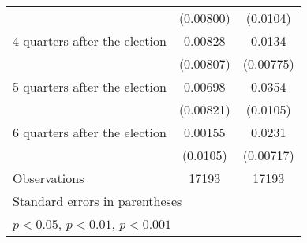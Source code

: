\begin{table}[htbp]
\begin{tabular}{l*{2}{c}}
                    &   (0.00800)         &    (0.0104)         \\
[1em]
 4 quarters after the election&     0.00828         &      0.0134         \\
                    &   (0.00807)         &   (0.00775)         \\
[1em]
 5 quarters after the election&     0.00698         &      0.0354\sym{***}\\
                    &   (0.00821)         &    (0.0105)         \\
[1em]
 6 quarters after the election&     0.00155         &      0.0231\sym{**} \\
                    &    (0.0105)         &   (0.00717)         \\
\hline
Observations        &       17193         &       17193         \\
\hline\hline
\multicolumn{3}{l}{\footnotesize Standard errors in parentheses}\\
\multicolumn{3}{l}{\footnotesize \sym{*} \(p<0.05\), \sym{**} \(p<0.01\), \sym{***} \(p<0.001\)}\\
\end{tabular}
\end{table}
